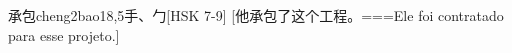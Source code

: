 \begin{EntryWithPhonetic}{承包}{cheng2bao1}{8,5}{⼿、⼓}[HSK 7-9]
  [他承包了这个工程。===Ele foi contratado para esse projeto.]
\end{EntryWithPhonetic}
